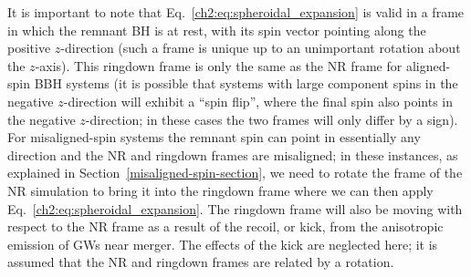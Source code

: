 It is important to note that Eq.~\ref{ch2:eq:spheroidal_expansion} is valid in a frame in which the remnant BH is at rest, with its spin vector pointing along the positive $z$-direction (such a frame is unique up to an unimportant rotation about the $z$-axis).
This ringdown frame is only the same as the NR frame for aligned-spin BBH systems (it is possible that systems with large component spins in the negative $z$-direction will exhibit a ``spin flip'', where the final spin also points in the negative $z$-direction; in these cases the two frames will only differ by a sign).
For misaligned-spin systems the remnant spin can point in essentially any direction and the NR and ringdown frames are misaligned; in these instances, as explained in Section~\ref{misaligned-spin-section}, we need to rotate the frame of the NR simulation to bring it into the ringdown frame where we can then apply Eq.~\ref{ch2:eq:spheroidal_expansion}.
The ringdown frame will also be moving with respect to the NR frame as a result of the recoil, or kick, from the anisotropic emission of GWs near merger. 
The effects of the kick are neglected here; it is assumed that the NR and ringdown frames are related by a rotation.

